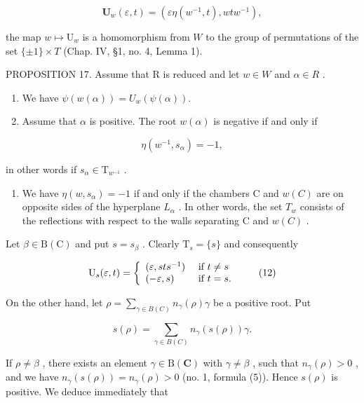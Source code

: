 \[
\mathbf {U} _ {w} (\varepsilon , t) = (\varepsilon \eta (w ^ {- 1}, t), w t w ^ {- 1}),
\]

the map \(w \mapsto \mathrm{U}_w\) is a homomorphism from \(W\) to the group of permutations of the set \(\{\pm 1\} \times T\) (Chap. IV, §1, no. 4, Lemma 1).

PROPOSITION 17. Assume that R is reduced and let \(w \in W\) and \(\alpha \in R\) .

\begin{enumerate}
\def\labelenumi{(\roman{enumi})}
\item
  We have \(\psi(w(\alpha)) = U_w(\psi(\alpha)).\)
\item
  Assume that \(\alpha\) is positive. The root \(w(\alpha)\) is negative if and only if
\end{enumerate}

\[
\eta (w ^ {- 1}, s _ {\alpha}) = - 1,
\]

in other words if \(s_{\alpha} \in \mathrm{T}_{w^{-1}}\) .

\begin{enumerate}
\def\labelenumi{(\roman{enumi})}
\setcounter{enumi}{2}
\tightlist
\item
  We have \(\eta(w,s_{\alpha})=-1\) if and only if the chambers C and \(w(C)\) are on opposite sides of the hyperplane \(L_{\alpha}\) . In other words, the set \(T_{w}\) consists of the reflections with respect to the walls separating C and \(w(C)\) .
\end{enumerate}

Let \(\beta \in \mathrm{B}(\mathrm{C})\) and put \(s = s_{\beta}\) . Clearly \(\mathrm{T}_s = \{s\}\) and consequently

\[
\mathrm{U} _ {s} (\varepsilon , t) = \left\{ \begin{array}{l l} (\varepsilon , s t s ^ {- 1}) & \text { if } t \neq s \\ (- \varepsilon , s) & \text { if } t = s. \end{array} \right.\tag{12}
\]

On the other hand, let \(\rho = \sum_{\gamma \in B(C)} n_{\gamma}(\rho) \gamma\) be a positive root. Put

\[
s (\rho) = \sum_ {\gamma \in B (C)} n _ {\gamma} (s (\rho)) \gamma .
\]

If \(\rho \neq \beta\) , there exists an element \(\gamma \in \mathrm{B}(\mathbf{C})\) with \(\gamma \neq \beta\) , such that \(n_{\gamma}(\rho) > 0\) , and we have \(n_{\gamma}(s(\rho)) = n_{\gamma}(\rho) > 0\) (no. 1, formula (5)). Hence \(s(\rho)\) is positive. We deduce immediately that

